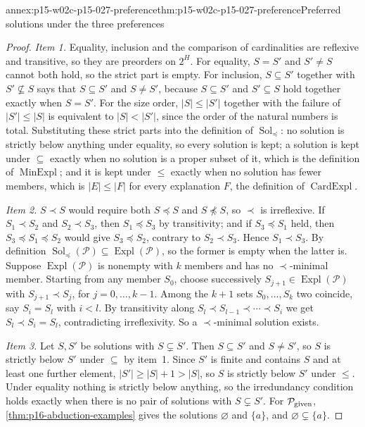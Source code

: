 \begin{annexitem}{annex:p15-w02c-p15-027-preference}{thm:p15-w02c-p15-027-preference}{Preferred solutions under the three preferences}
\begin{proof}
\emph{Item 1.} Equality, inclusion and the comparison of cardinalities are
reflexive and transitive, so they are preorders on \(2^H\). For equality,
\(S=S'\) and \(S'\ne S\) cannot both hold, so the strict part is empty.
For inclusion, \(S\subseteq S'\) together with \(S'\nsubseteq S\) says that
\(S\subseteq S'\) and \(S\ne S'\), because \(S\subseteq S'\) and
\(S'\subseteq S\) hold together exactly when \(S=S'\). For the size order,
\(|S|\le|S'|\) together with the failure of \(|S'|\le|S|\) is equivalent to
\(|S|<|S'|\), since the order of the natural numbers is total. Substituting
these strict parts into the definition of \(\operatorname{Sol}_{\preceq}\):
no solution is strictly below anything under equality, so every solution
is kept; a solution is kept under \(\subseteq\) exactly when no solution is
a proper subset of it, which is the definition of
\(\operatorname{MinExpl}\); and it is kept under \(\le\) exactly when no
solution has fewer members, which is \(|E|\le|F|\) for every explanation
\(F\), the definition of \(\operatorname{CardExpl}\).

\emph{Item 2.} \(S\prec S\) would require both \(S\preceq S\) and
\(S\not\preceq S\), so \(\prec\) is irreflexive. If \(S_1\prec S_2\) and
\(S_2\prec S_3\), then \(S_1\preceq S_3\) by transitivity; and if
\(S_3\preceq S_1\) held, then \(S_3\preceq S_1\preceq S_2\) would give
\(S_3\preceq S_2\), contrary to \(S_2\prec S_3\). Hence \(S_1\prec S_3\).
By definition \(\operatorname{Sol}_{\preceq}(\mathcal P)\subseteq
\operatorname{Expl}(\mathcal P)\), so the former is empty when the latter
is. Suppose \(\operatorname{Expl}(\mathcal P)\) is nonempty with \(k\)
members and has no \(\prec\)-minimal member. Starting from any member
\(S_0\), choose successively \(S_{j+1}\in\operatorname{Expl}(\mathcal P)\)
with \(S_{j+1}\prec S_j\), for \(j=0,\ldots,k-1\). Among the \(k+1\) sets
\(S_0,\ldots,S_k\) two coincide, say \(S_i=S_l\) with \(i<l\). By
transitivity along \(S_l\prec S_{l-1}\prec\cdots\prec S_i\) we get
\(S_l\prec S_i=S_l\), contradicting irreflexivity. So a \(\prec\)-minimal
solution exists.

\emph{Item 3.} Let \(S,S'\) be solutions with \(S\subsetneq S'\). Then
\(S\subseteq S'\) and \(S\ne S'\), so \(S\) is strictly below \(S'\) under
\(\subseteq\) by item~1. Since \(S'\) is finite and contains \(S\) and at
least one further element, \(|S'|\ge|S|+1>|S|\), so \(S\) is strictly
below \(S'\) under \(\le\). Under equality nothing is strictly below
anything, so the irredundancy condition holds exactly when there is no
pair of solutions with \(S\subsetneq S'\). For \(\mathcal P_{\rm given}\),
\cref{thm:p16-abduction-examples} gives the solutions \(\varnothing\) and
\(\{a\}\), and \(\varnothing\subsetneq\{a\}\).


\end{proof}
\end{annexitem}
